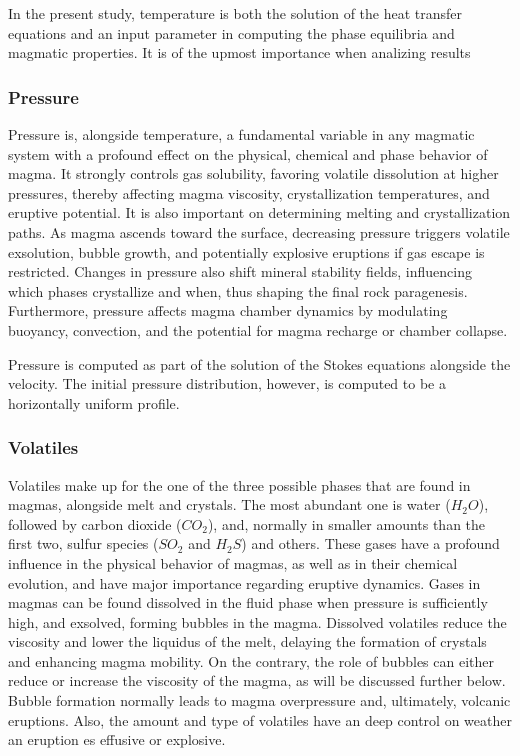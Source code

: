In the present study, temperature is both the solution of the heat transfer equations and an input parameter in computing the phase equilibria and magmatic properties. It is of the upmost importance when analizing results
\subsubsection{Pressure}
Pressure is, alongside temperature, a fundamental variable in any magmatic system with a profound effect on the physical, chemical and phase behavior of magma. It strongly controls gas solubility, favoring volatile dissolution at higher pressures, thereby affecting magma viscosity, crystallization temperatures, and eruptive potential. It is also important on determining melting and crystallization paths. As magma ascends toward the surface, decreasing pressure triggers volatile exsolution, bubble growth, and potentially explosive eruptions if gas escape is restricted. Changes in pressure also shift mineral stability fields, influencing which phases crystallize and when, thus shaping the final rock paragenesis. Furthermore, pressure affects magma chamber dynamics by modulating buoyancy, convection, and the potential for magma recharge or chamber collapse.

Pressure is computed as part of the solution of the Stokes equations alongside the velocity. The initial pressure distribution, however, is computed to be a horizontally uniform profile.

\subsubsection{Volatiles}
Volatiles make up for the one of the three possible phases that are found in magmas, alongside melt and crystals. The most abundant one is water ($H_2O$), followed by carbon dioxide ($CO_2$), and, normally in smaller amounts than the first two, sulfur species ($SO_2$ and $H_2S$) and others. These gases have a profound influence in the physical behavior of magmas, as well as in their chemical evolution, and have major importance regarding eruptive dynamics. Gases in magmas can be found dissolved in the fluid phase when pressure is sufficiently high, and exsolved, forming bubbles in the magma. Dissolved volatiles reduce the viscosity and lower the liquidus of the melt, delaying the formation of crystals and enhancing magma mobility. On the contrary, the role of bubbles can either reduce or increase the viscosity of the magma, as will be discussed further below. Bubble formation normally leads to magma overpressure and, ultimately, volcanic eruptions. Also, the amount and type of volatiles have an deep control on weather an eruption es effusive or explosive.

